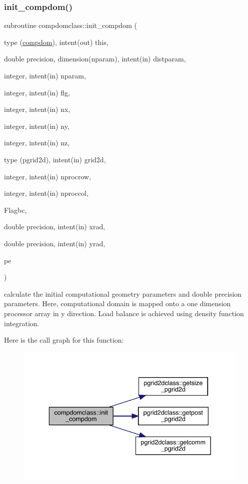 \subsubsection{\texorpdfstring{init\_compdom()}{init\_compdom()}}
{\footnotesize\ttfamily subroutine compdomclass\+::init\+\_\+compdom (\begin{DoxyParamCaption}\item[{type (\mbox{\hyperlink{namespacecompdomclass_structcompdomclass_1_1compdom}{compdom}}), intent(out)}]{this,  }\item[{double precision, dimension(nparam), intent(in)}]{distparam,  }\item[{integer, intent(in)}]{nparam,  }\item[{integer, intent(in)}]{flg,  }\item[{integer, intent(in)}]{nx,  }\item[{integer, intent(in)}]{ny,  }\item[{integer, intent(in)}]{nz,  }\item[{type (pgrid2d), intent(in)}]{grid2d,  }\item[{integer, intent(in)}]{nprocrow,  }\item[{integer, intent(in)}]{nproccol,  }\item[{}]{Flagbc,  }\item[{double precision, intent(in)}]{xrad,  }\item[{double precision, intent(in)}]{yrad,  }\item[{}]{pe }\end{DoxyParamCaption})}



calculate the initial computational geometry parameters and double precision parameters. Here, computational domain is mapped onto a one dimension processor array in y direction. Load balance is achieved using density function integration. 

Here is the call graph for this function\+:\nopagebreak
\begin{figure}[H]
\begin{center}
\leavevmode
\includegraphics[width=336pt]{namespacecompdomclass_acdfdc48f4091ad70b76c1c7ed66c10b0_cgraph}
\end{center}
\end{figure}
\mbox{\label{namespacecompdomclass_a60f5ad087b624e541fe9c0872e1c4b90}} 
